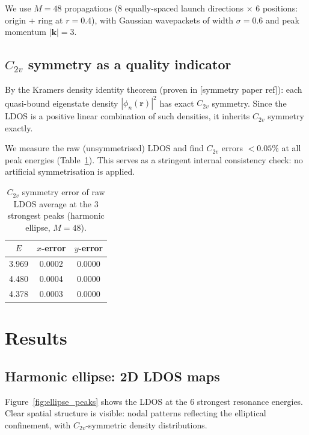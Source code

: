 \documentclass[11pt,a4paper]{article}
\newcommand{\vb}[1]{\mathbf{#1}}
\begin{document}
We use $M = 48$ propagations (8 equally-spaced launch directions
$\times$ 6 positions: origin + ring at $r = 0.4$), with Gaussian
wavepackets of width $\sigma = 0.6$ and peak momentum $|\vb{k}| = 3$.

\subsection{$C_{2v}$ symmetry as a quality indicator}

By the Kramers density identity theorem (proven in [symmetry paper ref]):
each quasi-bound eigenstate density $|\phi_n(\vb{r})|^2$ has exact
$C_{2v}$ symmetry.  Since the LDOS is a positive linear combination of
such densities, it inherits $C_{2v}$ symmetry exactly.

We measure the raw (unsymmetrised) LDOS and find $C_{2v}$ errors
$< 0.05\%$ at all peak energies (Table~\ref{tab:c2v}).  This serves as
a stringent internal consistency check: no artificial symmetrisation is
applied.

\begin{table}[h]
\centering
\caption{$C_{2v}$ symmetry error of raw LDOS average at the 3 strongest
peaks (harmonic ellipse, $M = 48$).}
\label{tab:c2v}
\begin{tabular}{ccc}
\toprule
$E$ & $x$-error & $y$-error \\
\midrule
3.969 & 0.0002 & 0.0000 \\
4.480 & 0.0004 & 0.0000 \\
4.378 & 0.0003 & 0.0000 \\
\bottomrule
\end{tabular}
\end{table}

\section{Results}
\label{sec:results}

\subsection{Harmonic ellipse: 2D LDOS maps}

Figure~\ref{fig:ellipse_peaks} shows the LDOS at the 6 strongest
resonance energies.  Clear spatial structure is visible: nodal patterns
reflecting the elliptical confinement, with $C_{2v}$-symmetric density
distributions.
\end{document}
